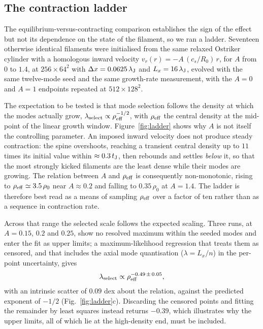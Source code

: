 \documentclass[usenatbib,twoside,twocolumn]{mnras}
\begin{document}
\subsection{The contraction ladder}
\label{sec:ladder}

The equilibrium-versus-contracting comparison establishes the sign of the effect but not its dependence on the state of the filament, so we ran a ladder. Seventeen otherwise identical filaments were initialised from the same relaxed Ostriker cylinder with a homologous inward velocity $v_r(r)=-A\,(c_s/R_0)\,r$, for $A$ from $0$ to $1.4$, at $256\times64^2$ with $\Delta x=0.0625\,\lambda_{\rm J}$ and $L_x=16\,\lambda_{\rm J}$, evolved with the same twelve-mode seed and the same growth-rate measurement, with the $A=0$ and $A=1$ endpoints repeated at $512\times128^2$.

The expectation to be tested is that mode selection follows the density at which the modes actually grow, $\lambda_{\rm select}\propto\rho_{\rm eff}^{-1/2}$, with $\rho_{\rm eff}$ the central density at the mid-point of the linear growth window. Figure~\ref{fig:ladder} shows why $A$ is not itself the controlling parameter. An imposed inward velocity does not produce steady contraction: the spine overshoots, reaching a transient central density up to $11$ times its initial value within $\approx0.3\,t_{\rm J}$, then rebounds and settles \emph{below} it, so that the most strongly kicked filaments are the least dense while their modes are growing. The relation between $A$ and $\rho_{\rm eff}$ is consequently non-monotonic, rising to $\rho_{\rm eff}\simeq3.5\,\rho_0$ near $A\approx0.2$ and falling to $0.35\,\rho_0$ at $A=1.4$. The ladder is therefore best read as a means of sampling $\rho_{\rm eff}$ over a factor of ten rather than as a sequence in contraction rate.

Across that range the selected scale follows the expected scaling. Three runs, at $A=0.15$, $0.2$ and $0.25$, show no resolved maximum within the seeded modes and enter the fit as upper limits; a maximum-likelihood regression that treats them as censored, and that includes the axial mode quantisation ($\lambda=L_x/n$) in the per-point uncertainty, gives
\begin{equation}
\lambda_{\rm select}\propto\rho_{\rm eff}^{-0.49\,\pm\,0.05},
\label{eq:ladderfit}
\end{equation}
with an intrinsic scatter of $0.09$ dex about the relation, against the predicted exponent of $-1/2$ (Fig.~\ref{fig:ladder}c). Discarding the censored points and fitting the remainder by least squares instead returns $-0.39$, which illustrates why the upper limits, all of which lie at the high-density end, must be included.
\end{document}
